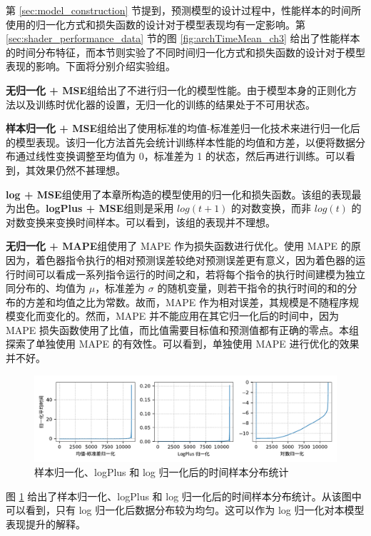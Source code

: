 {\added 第 \ref{sec:model_construction} 节提到，预测模型的设计过程中，性能样本的时间所使用的归一化方式和损失函数的设计对于模型表现均有一定影响。第 \ref{sec:shader_performance_data} 节的图 \ref{fig:archTimeMean_ch3} 给出了性能样本的时间分布特征，而本节则实验了不同时间归一化方式和损失函数的设计对于模型表现的影响。下面将分别介绍实验组。

{\bf 无归一化 + MSE}组给出了不进行归一化的模型性能。由于模型本身的正则化方法以及训练时优化器的设置，无归一化的训练的结果处于不可用状态。

{\bf 样本归一化 + MSE}组给出了使用标准的均值-标准差归一化技术来进行归一化后的模型表现。该归一化方法首先会统计训练样本性能的均值和方差，以便将数据分布通过线性变换调整至均值为 0，标准差为 1 的状态，然后再进行训练。可以看到，其效果仍然不甚理想。

{\bf log + MSE}组使用了本章所构造的模型使用的归一化和损失函数。该组的表现最为出色。{\bf logPlus + MSE}组则是采用 $ log(t+1) $ 的对数变换，而非 $log(t)$ 的对数变换来变换时间样本。可以看到，该组的表现并不理想。

{\bf 无归一化 + MAPE}组使用了 MAPE 作为损失函数进行优化。使用 MAPE 的原因为，着色器指令执行的相对预测误差较绝对预测误差更有意义，因为着色器的运行时间可以看成一系列指令运行的时间之和，若将每个指令的执行时间建模为独立同分布的、均值为 $ \mu $，标准差为 $ \sigma $ 的随机变量，则若干指令的执行时间的和的分布的方差和均值之比为常数。故而，MAPE 作为相对误差，其规模是不随程序规模变化而变化的。然而，MAPE 并不能应用在其它归一化后的时间中，因为 MAPE 损失函数使用了比值，而比值需要目标值和预测值都有正确的零点。本组探索了单独使用 MAPE 的有效性。可以看到，单独使用 MAPE 进行优化的效果并不好。

\begin{figure}[htbp]
    \centering
    \includegraphics[width=1.0\linewidth]{figures/RTX3060-Mean-Time-Normalized.pdf}
    \caption{样本归一化、logPlus 和 log 归一化后的时间样本分布统计}
    \label{fig:normalize_methods}
\end{figure}

图 \ref{fig:normalize_methods} 给出了样本归一化、logPlus 和 log 归一化后的时间样本分布统计。从该图中可以看到，只有 log 归一化后数据分布较为均匀。这可以作为 log 归一化对本模型表现提升的解释。

}

